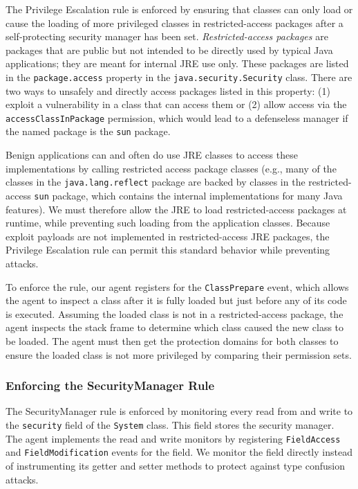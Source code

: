 \documentclass{sig-alternate}
\begin{document}
The Privilege Escalation rule is enforced by ensuring that classes
can only load or cause the loading of more privileged classes in restricted-access
packages after a self-protecting security manager has been set. \textit{Restricted-access
packages} are packages that are public but not intended to be directly
used by typical Java applications; they are meant for internal JRE
use only. These packages are listed in the \texttt{package.access}
property in the \texttt{java.security.Security} class. There are two
ways to unsafely and directly access packages listed in this property:
(1) exploit a vulnerability in a class that can access them or (2)
allow access via the \texttt{accessClassInPackage} permission, which would lead to a defenseless manager if the named package is the \texttt{sun} package.

Benign applications can and often do use JRE classes to access these implementations by
calling restricted access package
classes (e.g., many of the classes in the \texttt{java.lang.reflect}
package are backed by classes in the restricted-access \texttt{sun} package, which
contains the internal implementations
for many Java features). We must therefore allow the JRE to load restricted-access packages
at runtime, while preventing such loading from the application classes.
Because exploit payloads are not implemented in restricted-access JRE packages,
the Privilege Escalation rule can permit this standard behavior while preventing
attacks.

To enforce the rule, our agent registers for
the \texttt{ClassPrepare} event, which allows the agent to inspect
a class after it is fully loaded but just before any of its code is
executed. Assuming the loaded class is not in a restricted-access
package, the agent inspects the stack frame to determine which class
caused the new class to be loaded. The agent must then get the protection
domains for both classes to ensure the loaded class is not more privileged by comparing their permission sets.

\subsubsection{Enforcing the SecurityManager Rule}\label{sub:Enforcing-the-SecurityManager}

The SecurityManager rule is enforced by monitoring every read from
and write to the \texttt{security} field of the \texttt{System} class.
This field stores the security manager.
The agent implements the read and write monitors by registering
\texttt{FieldAccess} and \texttt{FieldModification} events for the field. We 
monitor the field directly instead of instrumenting its getter and setter
methods to protect against type confusion attacks. 
\end{document}
